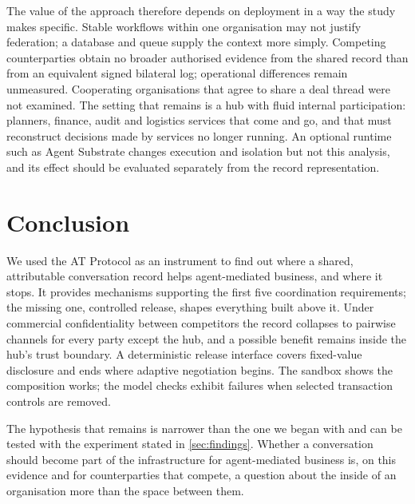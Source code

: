 The value of the approach therefore depends on deployment in a way the study makes specific. Stable workflows within one organisation may not justify federation; a database and queue supply the context more simply. Competing counterparties obtain no broader authorised evidence from the shared record than from an equivalent signed bilateral log; operational differences remain unmeasured. Cooperating organisations that agree to share a deal thread were not examined. The setting that remains is a hub with fluid internal participation: planners, finance, audit and logistics services that come and go, and that must reconstruct decisions made by services no longer running. An optional runtime such as Agent Substrate changes execution and isolation but not this analysis, and its effect should be evaluated separately from the record representation.

\section{Conclusion}
\label{sec:conclusion}

We used the AT Protocol as an instrument to find out where a shared, attributable conversation record helps agent-mediated business, and where it stops. It provides mechanisms supporting the first five coordination requirements; the missing one, controlled release, shapes everything built above it. Under commercial confidentiality between competitors the record collapses to pairwise channels for every party except the hub, and a possible benefit remains inside the hub's trust boundary. A deterministic release interface covers fixed-value disclosure and ends where adaptive negotiation begins. The sandbox shows the composition works; the model checks exhibit failures when selected transaction controls are removed.

The hypothesis that remains is narrower than the one we began with and can be tested with the experiment stated in \cref{sec:findings}. Whether a conversation should become part of the infrastructure for agent-mediated business is, on this evidence and for counterparties that compete, a question about the inside of an organisation more than the space between them.
